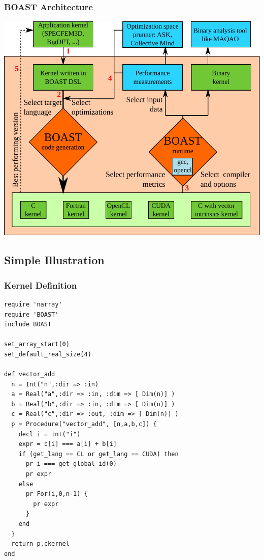 \documentclass{beamer}
\begin{document}
\begin{frame}
\frametitle{BOAST Architecture}
 \begin{center}
   \includegraphics[scale=0.5]{BOAST_Workflow}
 \end{center}
\end{frame}

\subsection{Simple Illustration}

\begin{frame}[fragile]
\frametitle{Kernel Definition}
\lstset{style=BOAST}
\begin{lstlisting}
require 'narray'
require 'BOAST'
include BOAST

set_array_start(0)
set_default_real_size(4)

def vector_add
  n = Int("n",:dir => :in)
  a = Real("a",:dir => :in, :dim => [ Dim(n)] )
  b = Real("b",:dir => :in, :dim => [ Dim(n)] )
  c = Real("c",:dir => :out, :dim => [ Dim(n)] )
  p = Procedure("vector_add", [n,a,b,c]) {
    decl i = Int("i")
    expr = c[i] === a[i] + b[i]
    if (get_lang == CL or get_lang == CUDA) then
      pr i === get_global_id(0)
      pr expr
    else
      pr For(i,0,n-1) {
        pr expr
      }
    end
  }
  return p.ckernel
end
\end{lstlisting}
\end{frame}
\end{document}
